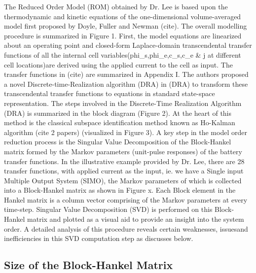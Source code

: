 

The  Reduced  Order  Model  (ROM)  obtained   by  Dr.  Lee  is  based  upon  the
thermodynamic and kinetic equations of the one-dimensional volume-averaged model
first  proposed  by Doyle,  Fuller  and  Newman  (cite). The  overall  modelling
procedure is summarized  in Figure 1. First, the model  equations are linearized
about an operating point  and closed-form Laplace-domain transcendental transfer
functions of  all the  internal cell  variables(phi\_s,phi\_e,c\_s,c\_e \&  j at
different cell  locations)are derived using the  applied current to the  cell as
input.  The transfer  functions  in (cite)  are summarized  in  Appendix I.  The
authors proposed a  novel Discrete-time-Realization algorithm (DRA)  in (DRA) to
transform  these  transcendental transfer  functions  to  equations in  standard
state-space representation. The steps  involved in the Discrete-Time Realization
Algorithm (DRA) is summarized  in the block diagram (Figure 2).  At the heart of
this method is  the classical subspace identification method  known as Ho-Kalman
algorithm (cite  2 papers)  (visualized in Figure  3). A key  step in  the model
order reduction process is the  Singular Value Decomposition of the Block-Hankel
matrix formed  by the  Markov parameters (unit-pulse  responses) of  the battery
transfer functions. In  the illustrative example provided by Dr.  Lee, there are
28 transfer functions, with  applied current as the input, ie.  we have a Single
input Multiple Output System (SIMO), the Markov parameters of which is collected
into a  Block-Hankel matrix  as shown  in Figure  x. Each  Block element  in the
Hankel matrix  is a column vector  comprising of the Markov  parameters at every
time-step. Singular Value Decomposition (SVD)  is performed on this Block-Hankel
matrix and plotted as a visual aid  to provide an insight into the system order.
A  detailed analysis  of this  procedure reveals  certain weaknesses,  issuesand
inefficiencies in this SVD computation step as discusses below.

\subsection{Size of the Block-Hankel Matrix}

